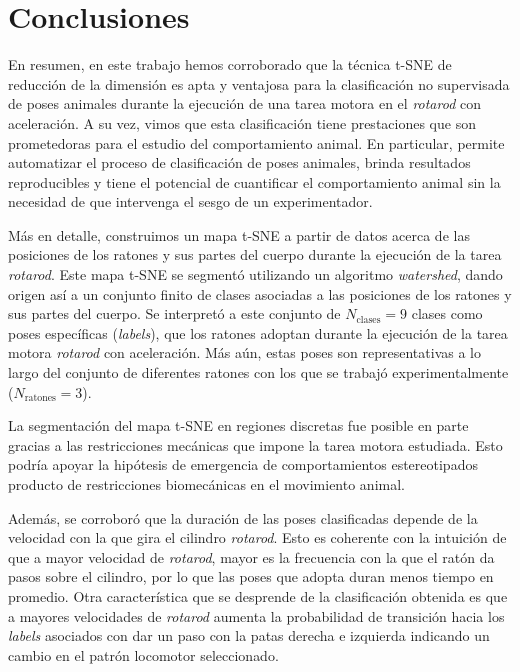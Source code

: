 \chapter*{Conclusiones}\label{cha:conclusiones}

En resumen, en este trabajo hemos corroborado que la técnica t-SNE de reducción de la dimensión es apta y ventajosa para la clasificación no supervisada de poses animales durante la ejecución de una tarea motora en el \textit{rotarod} con aceleración. A su vez, vimos que esta clasificación tiene prestaciones que son prometedoras para el estudio del comportamiento animal. En particular, permite automatizar el proceso de clasificación de poses animales, brinda resultados reproducibles y tiene el potencial de cuantificar el comportamiento animal sin la necesidad de que intervenga el sesgo de un experimentador.

Más en detalle, construimos un mapa t-SNE a partir de datos acerca de las posiciones de los ratones y sus partes del cuerpo durante la ejecución de la tarea \textit{rotarod}. Este mapa t-SNE se segmentó utilizando un algoritmo \textit{watershed}, dando origen así a un conjunto finito de clases asociadas a las posiciones de los ratones y sus partes del cuerpo. Se interpretó a este conjunto de $N_{\mathrm{clases}} = 9$ clases como poses específicas (\textit{labels}), que los ratones adoptan durante la ejecución de la tarea motora \textit{rotarod} con aceleración. Más aún, estas poses son representativas a lo largo del conjunto de diferentes ratones con los que se trabajó experimentalmente ($N_{\mathrm{ratones}} = 3$).

La segmentación del mapa t-SNE en regiones discretas fue posible en parte gracias a las restricciones mecánicas que impone la tarea motora estudiada. Esto podría apoyar la hipótesis de emergencia de comportamientos estereotipados producto de restricciones biomecánicas en el movimiento animal.

Además, se corroboró que la duración de las poses clasificadas depende de la velocidad con la que gira el cilindro \textit{rotarod}. Esto es coherente con la intuición de que a mayor velocidad de \textit{rotarod}, mayor es la frecuencia con la que el ratón da pasos sobre el cilindro, por lo que las poses que adopta duran menos tiempo en promedio. Otra característica que se desprende de la clasificación obtenida es que a mayores velocidades de \textit{rotarod} aumenta la probabilidad de transición hacia los \textit{labels} asociados con dar un paso con la patas derecha e izquierda indicando un cambio en el patrón locomotor seleccionado. 

